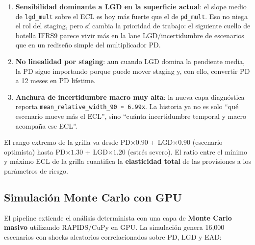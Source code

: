 \documentclass[
  spanish,
  11pt,
  letterpaper,
]{scrbook}
\theoremstyle{plain}
\theoremstyle{remark}
\begin{document}
\begin{enumerate}
\def\labelenumi{\arabic{enumi}.}
\item
  \textbf{Sensibilidad dominante a LGD en la superficie actual}: el
  slope medio de \texttt{lgd\_mult} sobre el ECL es hoy más fuerte que
  el de \texttt{pd\_mult}. Eso no niega el rol del staging, pero sí
  cambia la prioridad de trabajo: el siguiente cuello de botella IFRS9
  parece vivir más en la lane LGD/incertidumbre de escenarios que en un
  rediseño simple del multiplicador PD.
\item
  \textbf{No linealidad por staging}: aun cuando LGD domina la pendiente
  media, la PD sigue importando porque puede mover staging y, con ello,
  convertir PD a 12 meses en PD lifetime.
\item
  \textbf{Anchura de incertidumbre macro muy alta}: la nueva capa
  diagnóstica reporta \texttt{mean\_relative\_width\_90\ ≈\ 6.99x}. La
  historia ya no es solo ``qué escenario mueve más el ECL'', sino
  ``cuánta incertidumbre temporal y macro acompaña ese ECL''.
\end{enumerate}

\begin{tcolorbox}[enhanced jigsaw, arc=.35mm, bottomrule=.15mm, bottomtitle=1mm, breakable, colback=white, colbacktitle=quarto-callout-note-color!10!white, colframe=quarto-callout-note-color-frame, coltitle=black, left=2mm, leftrule=.75mm, opacityback=0, opacitybacktitle=0.6, rightrule=.15mm, title=\textcolor{quarto-callout-note-color}{\faInfo}\hspace{0.5em}{Rango de la Grilla}, titlerule=0mm, toprule=.15mm, toptitle=1mm]

El rango extremo de la grilla va desde PD\(\times 0.90\) +
LGD\(\times 0.90\) (escenario optimista) hasta PD\(\times 1.30\) +
LGD\(\times 1.20\) (estrés severo). El ratio entre el mínimo y máximo
ECL de la grilla cuantifica la \textbf{elasticidad total} de las
provisiones a los parámetros de riesgo.

\end{tcolorbox}

\subsection{Simulación Monte Carlo con
GPU}\label{simulaciuxf3n-monte-carlo-con-gpu}

El pipeline extiende el análisis determinista con una capa de
\textbf{Monte Carlo masivo} utilizando RAPIDS/CuPy en GPU. La simulación
genera 16,000 escenarios con shocks aleatorios correlacionados sobre PD,
LGD y EAD:
\end{document}

